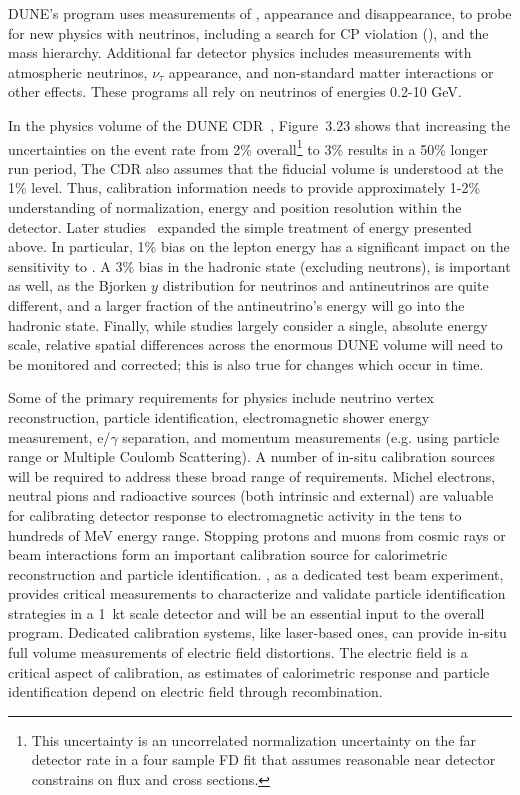 DUNE's  program %
uses measurements of %
\nue, \anue appearance and \numu %
disappearance, to probe for new physics with neutrinos, including a search for CP violation (), and the mass hierarchy. Additional far detector physics includes measurements with atmospheric neutrinos, $\nu_\tau$ appearance, and non-standard matter  interactions or other effects. These programs all
rely on neutrinos of energies 0.2-10 GeV. 

In the physics volume of the DUNE CDR~\cite{Acciarri:2015uup}, Figure~3.23 shows that increasing the uncertainties on the \nue event rate from 
\num{2}\% overall\footnote{This uncertainty is an uncorrelated normalization uncertainty on the far detector \nue rate in a four sample FD fit that assumes reasonable near detector constrains on flux and cross sections.} to \num{3}\% results in a \num{50}\% longer run period, 
The CDR also assumes that the fiducial volume is understood at the 1\% level. Thus, calibration information needs to provide approximately 1-2\% understanding of normalization, energy and position resolution within the detector. Later studies~\cite{ebias} expanded the simple treatment of energy  presented above. In particular, \num{1}\% bias on the lepton energy has a significant impact on the sensitivity to . A \num{3}\% bias in the hadronic state (excluding neutrons), is important as well, as the Bjorken $y$ distribution for neutrinos and antineutrinos are quite different, and a larger fraction of the  antineutrino's energy will go into the hadronic state.  Finally, while studies largely consider a single, absolute energy scale, relative spatial differences across the enormous DUNE  volume will need to be monitored and corrected; this is also true for changes which occur in time. 

Some of the primary requirements for  physics include neutrino vertex reconstruction, particle identification, electromagnetic shower energy measurement, e/$\gamma$ separation, and momentum measurements (e.g. using particle range or Multiple Coulomb Scattering). A number of in-situ calibration sources will be required to address these broad range of requirements. Michel electrons, neutral pions and radioactive sources (both intrinsic and external) are valuable for calibrating detector response to electromagnetic activity in the tens to hundreds of MeV energy range. Stopping protons and muons from cosmic rays or beam interactions form an important calibration source for calorimetric reconstruction and particle identification.
, as a dedicated test beam experiment, provides critical measurements to characterize and validate particle identification strategies in a 1~kt scale detector and will be an essential input to the overall program. 
Dedicated calibration systems, like laser-based ones, can provide in-situ full volume measurements of electric field distortions. The electric field is a critical aspect of calibration, as  estimates of calorimetric response and particle identification depend on electric field through recombination. 

